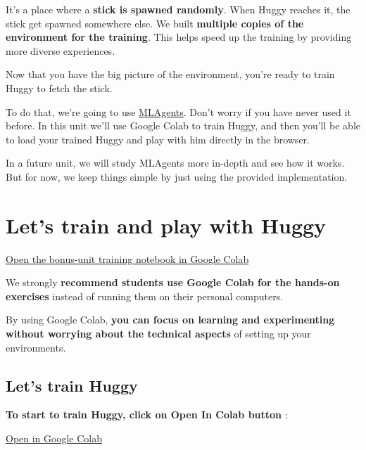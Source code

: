\documentclass[11pt,a4paper]{article}
\begin{document}
It's a place where a \textbf{stick is spawned randomly}. When Huggy reaches it, the stick get spawned somewhere else. We built \textbf{multiple copies of the environment for the training}. This helps speed up the training by providing more diverse experiences.

Now that you have the big picture of the environment, you're ready to train Huggy to fetch the stick.

To do that, we're going to use \href{https://github.com/Unity-Technologies/ml-agents}{MLAgents}. Don't worry if you have never used it before. In this unit we'll use Google Colab to train Huggy, and then you'll be able to load your trained Huggy and play with him directly in the browser.

In a future unit, we will study MLAgents more in-depth and see how it works. But for now, we keep things simple by just using the provided implementation.

\section{Let's train and play with Huggy}\label{lets-train-and-play-with-huggy}

\href{https://colab.research.google.com/github/huggingface/deep-rl-class/blob/master/notebooks/bonus-unit1/bonus-unit1.ipynb}{Open the bonus-unit training notebook in Google Colab}

We strongly \textbf{recommend students use Google Colab for the hands-on exercises} instead of running them on their personal computers.

By using Google Colab, \textbf{you can focus on learning and experimenting without worrying about the technical aspects} of setting up your environments.

\subsection{Let's train Huggy}\label{lets-train-huggy}

\textbf{To start to train Huggy, click on Open In Colab button} :

\href{https://colab.research.google.com/github/huggingface/deep-rl-class/blob/master/notebooks/bonus-unit1/bonus-unit1.ipynb}{Open in Google Colab}

\end{document}
